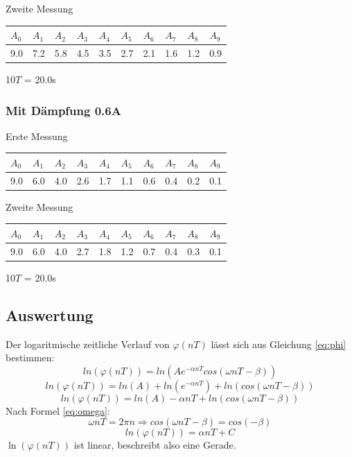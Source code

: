 \documentclass[12pt,a4paper]{article}
\begin{document}
\newpage
Zweite Messung

\vspace{3pt}
\begin{tabular}{|l|l|l|l|l|l|l|l|l|l|}
\hline
$A_{0}$&$A_{1}$&$A_{2}$&$A_{3}$&$A_{4}$&$A_{5}$&$A_{6}$&$A_{7}$&$A_{8}$&$A_{9}$\\
\hline
9.0&7.2&5.8&4.5&3.5&2.7&2.1&1.6&1.2&0.9\\
\hline
\end{tabular}

\vspace{10pt}
10$T$ = 20.0s

\subsubsection*{Mit D\"ampfung 0.6A}
Erste Messung

\begin{tabular}{|l|l|l|l|l|l|l|l|l|l|}
\hline
$A_{0}$&$A_{1}$&$A_{2}$&$A_{3}$&$A_{4}$&$A_{5}$&$A_{6}$&$A_{7}$&$A_{8}$&$A_{9}$\\
\hline
9.0&6.0&4.0&2.6&1.7&1.1&0.6&0.4&0.2&0.1\\
\hline
\end{tabular}
\vspace{10pt}

Zweite Messung

\vspace{3pt}
\begin{tabular}{|l|l|l|l|l|l|l|l|l|l|}
\hline
$A_{0}$&$A_{1}$&$A_{2}$&$A_{3}$&$A_{4}$&$A_{5}$&$A_{6}$&$A_{7}$&$A_{8}$&$A_{9}$\\
\hline
9.0&6.0&4.0&2.7&1.8&1.2&0.7&0.4&0.3&0.1\\
\hline
\end{tabular}

\vspace{10pt}
10$T$ = 20.0s

\subsection*{Auswertung}
Der logaritmische zeitliche Verlauf von $\varphi(nT)$ l\"asst sich aus Gleichung \ref{eq:phi} bestimmen:
\[ ln(\varphi(nT)) = ln(Ae^{-\alpha nT}cos(\omega nT - \beta)) \]
\[ ln(\varphi(nT)) = ln(A) + ln(e^{-\alpha nT}) + ln(cos(\omega nT - \beta)) \]
\[ ln(\varphi(nT)) = ln(A) -\alpha nT + ln(cos(\omega nT - \beta)) \]
Nach Formel \ref{eq:omega}:
\[ \omega nT = 2\pi n \Rightarrow cos(\omega nT - \beta) = cos(- \beta) \]
\[ ln(\varphi(nT)) = \alpha nT + C \]
$\ln(\varphi(nT))$ ist linear, beschreibt also eine Gerade.
\end{document}
